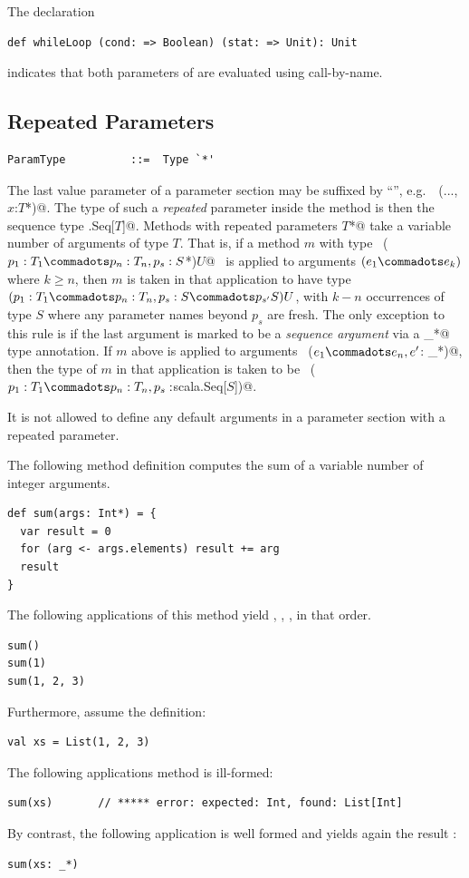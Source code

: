 \example The declaration
\begin{lstlisting}
def whileLoop (cond: => Boolean) (stat: => Unit): Unit
\end{lstlisting}
indicates that both parameters of  are evaluated using
call-by-name.

\subsection{Repeated Parameters}\label{sec:repeated-params}

\syntax\begin{lstlisting} 
ParamType          ::=  Type `*'
\end{lstlisting}

The last value parameter of a parameter section may be suffixed by
``\code{*}'', e.g.\ ~\lstinline@(..., $x$:$T$*)@.  The type of such a
{\em repeated} parameter inside the method is then the sequence type
\lstinline@scala.Seq[$T$]@.  Methods with repeated parameters
\lstinline@$T$*@ take a variable number of arguments of type $T$.
That is, if a method $m$ with type ~\lstinline@($p_1:T_1 \commadots p_n:T_n,
p_s:S$*)$U$@~ is applied to arguments $(e_1 \commadots e_k)$ where $k \geq
n$, then $m$ is taken in that application to have type $(p_1:T_1
\commadots p_n:T_n, p_s:S \commadots p_{s'}S)U$, with $k - n$ occurrences of type
$S$ where any parameter names beyond $p_s$ are fresh. The only exception to this rule is if the last argument is
marked to be a {\em sequence argument} via a \lstinline@_*@ type
annotation. If $m$ above is applied to arguments
~\lstinline@($e_1 \commadots e_n, e'$: _*)@, then the type of $m$ in
that application is taken to be 
~\lstinline@($p_1:T_1\commadots p_n:T_n,p_{s}:$scala.Seq[$S$])@.

It is not allowed to define any default arguments in a parameter section
with a repeated parameter.

\example The following method definition computes the sum of a variable number
of integer arguments.
\begin{lstlisting}
def sum(args: Int*) = {
  var result = 0
  for (arg <- args.elements) result += arg
  result
}
\end{lstlisting}
The following applications of this method yield , ,
, in that order.
\begin{lstlisting}
sum()
sum(1)
sum(1, 2, 3)
\end{lstlisting}
Furthermore, assume the definition:
\begin{lstlisting}
val xs = List(1, 2, 3)
\end{lstlisting}
The following applications method \lstinline@sum@ is ill-formed:
\begin{lstlisting}
sum(xs)       // ***** error: expected: Int, found: List[Int]
\end{lstlisting}
By contrast, the following application is well formed and yields again
the result :
\begin{lstlisting}
sum(xs: _*) 
\end{lstlisting}


